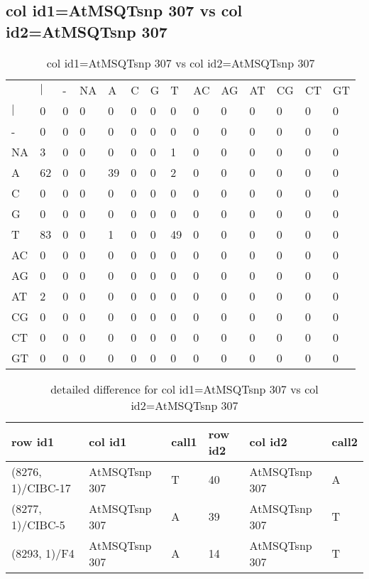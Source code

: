 \subsection{col id1=AtMSQTsnp 307 vs col id2=AtMSQTsnp 307}
\begin{center}
\begin{longtable}{|l|l|l|l|l|l|l|l|l|l|l|l|l|l|}
\caption{col id1=AtMSQTsnp 307 vs col id2=AtMSQTsnp 307} \label{table_dm644}\\
\hline
\\
\hline
&$|$&-&NA&A&C&G&T&AC&AG&AT&CG&CT&GT\\
$|$&0&0&0&0&0&0&0&0&0&0&0&0&0\\
-&0&0&0&0&0&0&0&0&0&0&0&0&0\\
NA&3&0&0&0&0&0&1&0&0&0&0&0&0\\
A&62&0&0&39&0&0&2&0&0&0&0&0&0\\
C&0&0&0&0&0&0&0&0&0&0&0&0&0\\
G&0&0&0&0&0&0&0&0&0&0&0&0&0\\
T&83&0&0&1&0&0&49&0&0&0&0&0&0\\
AC&0&0&0&0&0&0&0&0&0&0&0&0&0\\
AG&0&0&0&0&0&0&0&0&0&0&0&0&0\\
AT&2&0&0&0&0&0&0&0&0&0&0&0&0\\
CG&0&0&0&0&0&0&0&0&0&0&0&0&0\\
CT&0&0&0&0&0&0&0&0&0&0&0&0&0\\
GT&0&0&0&0&0&0&0&0&0&0&0&0&0\\
\hline
\end{longtable}
\end{center}

\begin{center}
\begin{longtable}{|l|l|l|l|l|l|}
\caption{detailed difference for col id1=AtMSQTsnp 307 vs col id2=AtMSQTsnp 307} \label{table_dm645}\\
\hline
row id1&col id1&call1&row id2&col id2&call2\\
\hline
(8276, 1)/CIBC-17&AtMSQTsnp 307&T&40&AtMSQTsnp 307&A\\
(8277, 1)/CIBC-5&AtMSQTsnp 307&A&39&AtMSQTsnp 307&T\\
(8293, 1)/F4&AtMSQTsnp 307&A&14&AtMSQTsnp 307&T\\
\hline
\end{longtable}
\end{center}

